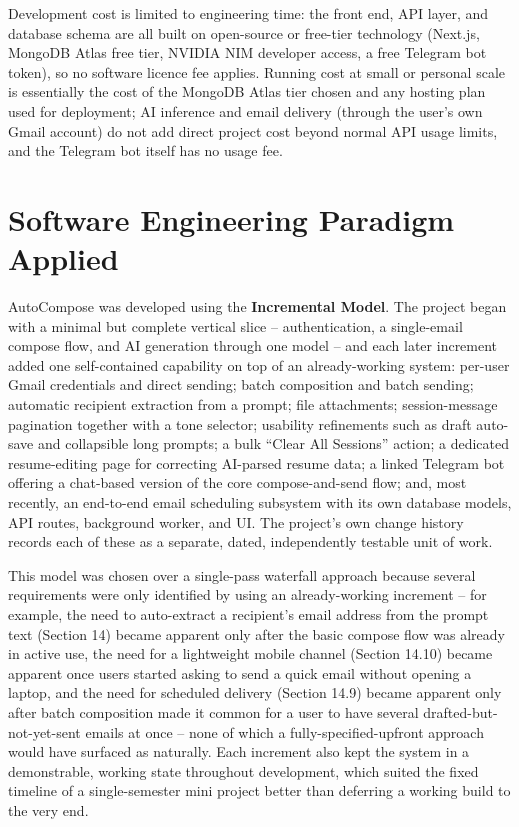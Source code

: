 \documentclass[12pt,a4paper]{article}
\begin{document}
Development cost is limited to engineering time: the front end, API layer, and database schema are all built on open-source or free-tier technology (Next.js, MongoDB Atlas free tier, NVIDIA NIM developer access, a free Telegram bot token), so no software licence fee applies. Running cost at small or personal scale is essentially the cost of the MongoDB Atlas tier chosen and any hosting plan used for deployment; AI inference and email delivery (through the user's own Gmail account) do not add direct project cost beyond normal API usage limits, and the Telegram bot itself has no usage fee. 

\section{Software Engineering Paradigm Applied}

AutoCompose was developed using the \textbf{Incremental Model}. The project began with a minimal but complete vertical slice -- authentication, a single-email compose flow, and AI generation through one model -- and each later increment added one self-contained capability on top of an already-working system: per-user Gmail credentials and direct sending; batch composition and batch sending; automatic recipient extraction from a prompt; file attachments; session-message pagination together with a tone selector; usability refinements such as draft auto-save and collapsible long prompts; a bulk ``Clear All Sessions'' action; a dedicated resume-editing page for correcting AI-parsed resume data; a linked Telegram bot offering a chat-based version of the core compose-and-send flow; and, most recently, an end-to-end email scheduling subsystem with its own database models, API routes, background worker, and UI. The project's own change history records each of these as a separate, dated, independently testable unit of work.

This model was chosen over a single-pass waterfall approach because several requirements were only identified by using an already-working increment -- for example, the need to auto-extract a recipient's email address from the prompt text (Section 14) became apparent only after the basic compose flow was already in active use, the need for a lightweight mobile channel (Section 14.10) became apparent once users started asking to send a quick email without opening a laptop, and the need for scheduled delivery (Section 14.9) became apparent only after batch composition made it common for a user to have several drafted-but-not-yet-sent emails at once -- none of which a fully-specified-upfront approach would have surfaced as naturally. Each increment also kept the system in a demonstrable, working state throughout development, which suited the fixed timeline of a single-semester mini project better than deferring a working build to the very end.
\end{document}
